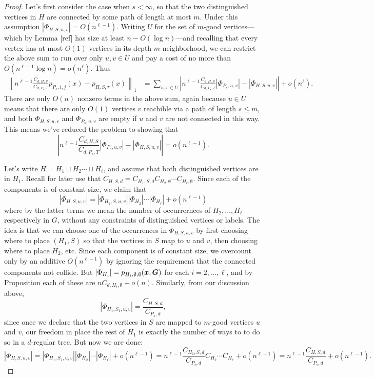 \begin{proof}
    Let's first consider the case when $s < \infty$, so that the two distinguished vertices in $H$ are connected by some path of length at most $m$. Under this assumption $|\Phi_{H,S,u,v}| = O(n^{\ell - 1})$. Writing $U$ for the set of $m$-good vertices---which by Lemma [ref] has size at least $n - O(\log n)$---and recalling that every vertex has at most $O(1)$ vertices in its depth-$m$ neighborhood, we can restrict the above sum to run over only $u,v \in U$ and pay a cost of no more than $O(n^{\ell - 1}\log n) = o(n^\ell)$. Thus
    \begin{align*}
        \left\| n^{\ell - 1}\frac{C_{d,H,S}}{C_{d,P_s,T}} p_{P_s,i,j}(x) - p_{H,S,\tau}(x) \right\|_1 
        &= \sum_{u,v \in U} \left|n^{\ell - 1}\frac{C_{d,H,S}}{C_{d,P_s,T}}|\Phi_{P_s,u,v}| - |\Phi_{H,S,u,v}| \right| + o(n^\ell).
    \end{align*}
    There are only $O(n)$ nonzero terms in the above sum, again because $u\in U$ means that there are only $O(1)$ vertices $v$ reachible via a path of length $s \le m$, and both $\Phi_{H,S,u,v}$ and $\Phi_{P_s,u,v}$ are empty if $u$ and $v$ are not connected in this way. This means we've reduced the problem to showing that
    $$
        \left|n^{\ell - 1}\frac{C_{d,H,S}}{C_{d,P_s,T}}|\Phi_{P_s,u,v}| - |\Phi_{H,S,u,v}| \right| = o(n^{\ell - 1}).
    $$

    Let's write $H = H_1 \sqcup H_2 \cdots \sqcup H_\ell$, and assume that both distinguished vertices are in $H_1$. Recall for later use that $C_{H,S,d} = C_{H_1,S,d} C_{H_2,\emptyset}\cdots C_{H_\ell,\emptyset}$. Since each of the components is of constant size, we claim that
    $$
        |\Phi_{H,S,u,v}| = |\Phi_{H_1,S,u,v}| |\Phi_{H_2}| \cdots |\Phi_{H_\ell}| + o(n^{\ell - 1})
    $$
    where by the latter terms we mean the number of occurrernces of $H_2,...,H_\ell$ respectively in $G$, without any constraints of distinguished vertices or labels. The idea is that we can choose one of the occurrences in $\Phi_{H,S,u,v}$ by first choosing where to place $(H_1,S)$ so that the vertices in $S$ map to $u$ and $v$, then choosing where to place $H_2$, etc. Since each component is of constant size, we overcount only by an additive $O(n^{\ell - 1})$ by ignoring the requirement that the connected components not collide. But $|\Phi_{H_i}| = p_{H_i,\emptyset,\emptyset}({\boldsymbol{x}},\boldsymbol{G})$ for each $i=2,...,\ell$, and by Proposition each of these are $nC_{d,H_i,\emptyset} + o(n)$. Similarly, from our discussion above,
    $$
        |\Phi_{H_1,S_1,u,v}| = \frac{C_{H,S,d}}{C_{P_s,d}},
    $$
    since once we declare that the two vertices in $S$ are mapped to $m$-good vertices $u$ and $v$, our freedom in place the rest of $H_1$ is exactly the number of ways to to do so in a $d$-regular tree. But now we are done:
    $$
        |\Phi_{H,S,u,v}| = |\Phi_{H_1,S_1,u,v}||\Phi_{H_2}|\cdots |\Phi_{H_\ell}| + o(n^{\ell - 1}) = n^{\ell - 1}\frac{C_{H_1,S,d}}{C_{P_s,d}}C_{H_2}\cdots C_{H_\ell} + o(n^{\ell - 1}) = n^{\ell - 1}\frac{C_{H,S,d}}{C_{P_s,d}} + o(n^{\ell - 1}).
    $$


\end{proof}
